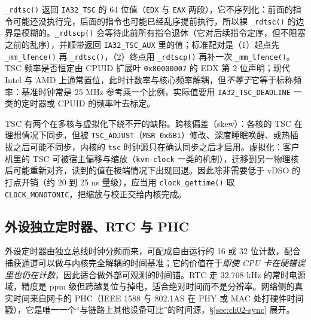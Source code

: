 \documentclass[12pt,a4paper,fontset=fandol]{ctexbook}
\newcommand{\Fn}[1]{\texttt{#1()}}
\newcommand{\Tp}[1]{\texttt{#1}}
\begin{document}
\Fn{\_rdtsc} 返回 \Tp{IA32\_TSC} 的 64 位值（\Tp{EDX} 与 \Tp{EAX} 两段），它不序列化：前面的指令可能还没执行完，后面的指令也可能已经乱序提前执行，所以裸 \Fn{\_rdtsc} 的边界是模糊的。\Fn{\_rdtscp} 会等待此前所有指令退休（它对后续指令定序，但不阻塞之前的乱序），并顺带返回 \Tp{IA32\_TSC\_AUX} 里的值；标准配对是（1）起点先 \Fn{\_mm\_lfence} 再 \Fn{\_rdtsc}，（2）终点用 \Fn{\_rdtscp} 再补一次 \Fn{\_mm\_lfence}。TSC 频率是否恒定由 CPUID 扩展叶 \Tp{0x80000007} 的 EDX 第 2 位声明；现代 Intel 与 AMD 上通常置位，此时计数率与核心频率解耦，但\emph{不等于}它等于标称频率：基准时钟常是 25 MHz 参考乘一个比例，实际值要用 \Tp{IA32\_TSC\_DEADLINE} 一类的定时器或 CPUID 的频率叶去标定。

TSC 有两个在多核与虚拟化下绕不开的缺陷。跨核偏差（skew）：各核的 TSC 在理想情况下同步，但被 \Tp{TSC\_ADJUST}（\Tp{MSR 0x6B1}）修改、深度睡眠唤醒、或热插拔之后可能不同步，内核的 \Tp{tsc} 时钟源只在确认同步之后才启用。虚拟化：客户机里的 TSC 可被宿主偏移与缩放（\Tp{kvm-clock} 一类的机制），迁移到另一物理核后可能重新对齐，读到的值在极端情况下出现回退。因此除非需要低于 vDSO 的打点开销（约 20 到 25 ns 量级），应当用 \Fn{clock\_gettime} 取 \Tp{CLOCK\_MONOTONIC}，把缩放与校正交给内核完成。

\subsection{外设独立定时器、RTC 与 PHC}

外设定时器由独立总线时钟分频而来，可配成自由运行的 16 或 32 位计数，配合捕获通道可以做与内核完全解耦的时间基准；它的价值在于\emph{即使 CPU 卡在硬错误里也仍在计数}，因此适合做外部可观测的时间锚。RTC 走 32.768 kHz 的常时电源域，精度是 ppm 级但跨越复位与掉电，适合绝对时间而不是分辨率。网络侧的真实时间来自网卡的 PHC（IEEE 1588 与 802.1AS 在 PHY 或 MAC 处打硬件时间戳），它是唯一一个``与链路上其他设备可比''的时间源，\S\ref{sec:ch02-sync} 展开。
\end{document}
